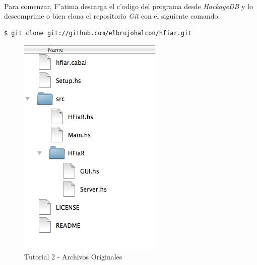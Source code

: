 \documentclass[a4paper]{article}
\begin{document}
\paragraph{}Para comenzar, F'atima descarga el c'odigo del programa desde \textsl{HackageDB} y lo descomprime o bien clona el repositorio \textsl{Git} con el siguiente comando:
\lstset{language=sh, frame=single, tabsize=2}
\begin{center}\begin{lstlisting}
$ git clone git://github.com/elbrujohalcon/hfiar.git
\end{lstlisting}\end{center}
\begin{figure}[hp]
	\begin{center}
        	\includegraphics{pictures/tut2/00}
		\caption{Tutorial 2 - Archivos Originales}
		\label{tut200}
	\end{center}
\end{figure}
\end{document}
